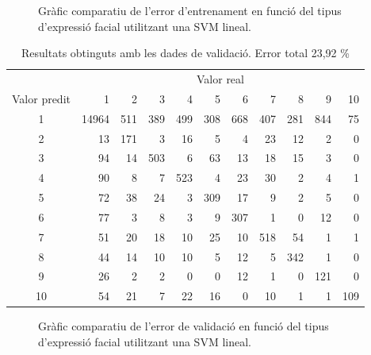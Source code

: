 \documentclass[a4paper]{article}
\begin{document}
\begin{figure}[H]
	\centering
	\captionsetup{width=0.8\textwidth}
	\caption{Gràfic comparatiu de l'error d'entrenament en funció del tipus d'expressió facial utilitzant una SVM lineal.}
\end{figure}

\begin{table}[H]
	\centering
	\def\arraystretch{1.2}
	\begin{tabular}{|c|rrrrrrrrrr|}
		\hline
		& \multicolumn{10}{c|}{Valor real} \\
		Valor predit & 1 & 2 & 3 & 4 & 5 & 6 & 7 & 8 & 9 & 10 \\
		\hline
		1 & 14964 & 511 & 389 & 499 & 308 & 668 & 407 & 281 & 844 & 75 \\
		2 & 13 & 171 & 3 & 16 & 5 & 4 & 23 & 12 & 2 & 0 \\
		3 & 94 & 14 & 503 & 6 & 63 & 13 & 18 & 15 & 3 & 0 \\
		4 & 90 & 8 & 7 & 523 & 4 & 23 & 30 & 2 & 4 & 1 \\
		5 & 72 & 38 & 24 & 3 & 309 & 17 & 9 & 2 & 5 & 0 \\
		6 & 77 & 3 & 8 & 3 & 9 & 307 & 1 & 0 & 12 & 0 \\
		7 & 51 & 20 & 18 & 10 & 25 & 10 & 518 & 54 & 1 & 1 \\
		8 & 44 & 14 & 10 & 10 & 5 & 12 & 5 & 342 & 1 & 0 \\
		9 & 26 & 2 & 2 & 0 & 0 & 12 & 1 & 0 & 121 & 0 \\
		10 & 54 & 21 & 7 & 22 & 16 & 0 & 10 & 1 & 1 & 109 \\
		\hline
	\end{tabular}
	\caption{Resultats obtinguts amb les dades de validació. Error total 23,92 \%}
	\label{tab:svm_lineal_k2}
\end{table}

\begin{figure}[H]
	\centering
	\captionsetup{width=0.8\textwidth}
	\caption{Gràfic comparatiu de l'error de validació en funció del tipus d'expressió facial utilitzant una SVM lineal.}
\end{figure}
\end{document}
